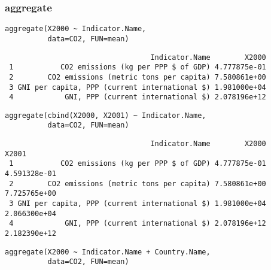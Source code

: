 \documentclass[xcolor={usenames,svgnames,dvipsnames}]{beamer}
\begin{document}
\begin{frame}[fragile]
\frametitle{aggregate}
\label{sec-3-6}


\lstset{language=R}
\begin{lstlisting}
aggregate(X2000 ~ Indicator.Name,
          data=CO2, FUN=mean)
\end{lstlisting}

\begin{verbatim}
                                  Indicator.Name        X2000
 1           CO2 emissions (kg per PPP $ of GDP) 4.777875e-01
 2        CO2 emissions (metric tons per capita) 7.580861e+00
 3 GNI per capita, PPP (current international $) 1.981000e+04
 4            GNI, PPP (current international $) 2.078196e+12
\end{verbatim}


\lstset{language=R}
\begin{lstlisting}
aggregate(cbind(X2000, X2001) ~ Indicator.Name,
          data=CO2, FUN=mean)
\end{lstlisting}

\begin{verbatim}
                                  Indicator.Name        X2000        X2001
 1           CO2 emissions (kg per PPP $ of GDP) 4.777875e-01 4.591328e-01
 2        CO2 emissions (metric tons per capita) 7.580861e+00 7.725765e+00
 3 GNI per capita, PPP (current international $) 1.981000e+04 2.066300e+04
 4            GNI, PPP (current international $) 2.078196e+12 2.182390e+12
\end{verbatim}


\lstset{language=R}
\begin{lstlisting}
aggregate(X2000 ~ Indicator.Name + Country.Name,
          data=CO2, FUN=mean)
\end{lstlisting}



\end{frame}
\end{document}
